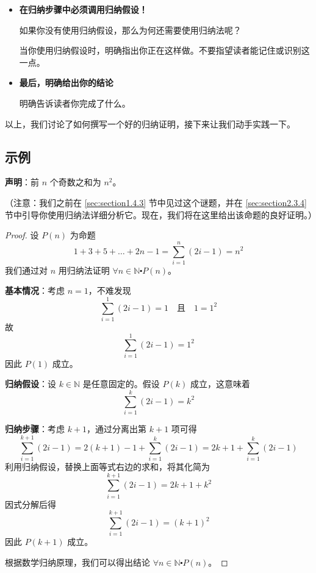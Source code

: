 \begin{itemize}
    \item \textbf{在归纳步骤中必须调用归纳假设！}
    
    如果你没有使用归纳假设，那么为何还需要使用归纳法呢？

    当你使用归纳假设时，明确指出你正在这样做。不要指望读者能记住或识别这一点。

    \item \textbf{最后，明确给出你的结论}
    
    明确告诉读者你完成了什么。\\
\end{itemize}

以上，我们讨论了如何撰写一个好的归纳证明，接下来让我们动手实践一下。

\subsection{示例}

\begin{example}[奇数之和是平方数]

    \textbf{声明}：前 $n$ 个奇数之和为 $n^2$。

    （注意：我们之前在 \ref{sec:section1.4.3} 节中见过这个谜题，并在 \ref{sec:section2.3.4} 节中引导你使用归纳法详细分析它。现在，我们将在这里给出该命题的良好证明。）
\end{example}

\begin{proof}
    设 $P(n)$ 为命题
    \[1+3+5+ \dots +2n-1 = \sum_{i=1}^n (2i-1) = n^2\]
    我们通过对 $n$ 用归纳法证明 $\forall n \in \mathbb{N} \centerdot P(n)$。

    \textbf{基本情况}：考虑 $n=1$，不难发现
    \[\sum_{i=1}^1 (2i-1) = 1 \quad \text{且} \quad 1=1^2\]
    故
    \[\sum_{i=1}^1 (2i-1) = 1^2\]
    因此 $P(1)$ 成立。

    \textbf{归纳假设}：设 $k \in \mathbb{N}$ 是任意固定的。假设 $P(k)$ 成立，这意味着
    \[\sum_{i=1}^k (2i-1) = k^2\]

    \textbf{归纳步骤}：考虑 $k+1$，通过分离出第 $k+1$ 项可得
    \[\sum_{i=1}^{k+1} (2i-1) = 2(k + 1) - 1 + \sum_{i=1}^k (2i-1) = 2k + 1 + \sum_{i=1}^k (2i-1)\]
    利用归纳假设，替换上面等式右边的求和，将其化简为
    \[\sum_{i=1}^{k+1} (2i-1) = 2k+1+k^2\]
    因式分解后得
    \[\sum_{i=1}^{k+1} (2i-1) = (k+1)^2\]
    因此 $P(k+1)$ 成立。

    根据数学归纳原理，我们可以得出结论 $\forall n \in \mathbb{N} \centerdot P(n)$。
\end{proof}

